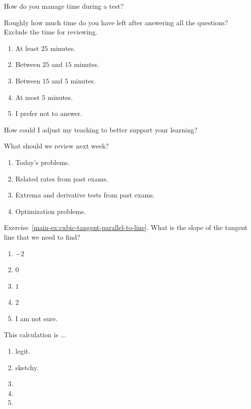 \documentclass[aspectratio=169, 14pt, t]{beamer}  %
\begin{document}
\begin{poll}
  How do you manage time during a test?
\end{poll}

\begin{poll}
  Roughly how much time do you have left after answering all the questions? Exclude the time for reviewing.

  \begin{enumerate}
    \item At least \(25\) minutes.
    \item Between \(25\) and \(15\) minutes.
    \item Between \(15\) and \(5\) minutes.
    \item At most \(5\) minutes.
    \item I prefer not to answer.
  \end{enumerate}
\end{poll}

\begin{poll}[c]
  How could I adjust my teaching to better support your learning?
\end{poll}

\begin{poll}[c]
  What should we review next week?

  \begin{enumerate}
    \item Today's problems.
    \item Related rates from past exams.
    \item Extrema and derivative tests from past exams.
    \item Optimization problems.
  \end{enumerate}
\end{poll}


\begin{poll}
  Exercise~\ref{main-ex:cubic-tangent-parallel-to-line}. What is the slope of the tangent line that we need to find?

  \begin{enumerate}
    \item \(-2\)
    \item \(0\)
    \item \(1\)
    \item \(2\)
    \item I am not sure.
  \end{enumerate}
\end{poll}

\begin{poll}
  This calculation is ...
  \begin{enumerate}
    \item legit.
    \item sketchy.
    \item 
    \item 
    \item {}
  \end{enumerate}
\end{poll}
\end{document}
